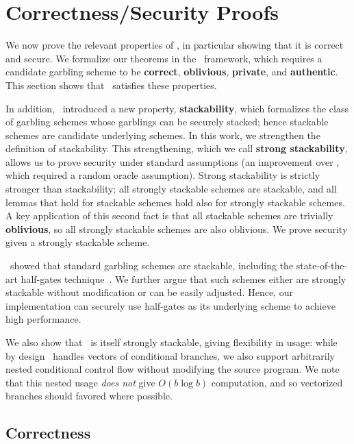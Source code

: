 \section{Correctness/Security Proofs}\label{sec:proof}

We now prove the relevant properties of \ourscheme, in particular
showing that it is correct and secure.
We formalize our theorems in the~\cite{CCS:BelHoaRog12} framework,
which requires a candidate garbling scheme to be \textbf{correct},
\textbf{oblivious}, \textbf{private}, and \textbf{authentic}.
This section shows that \ourscheme\ satisfies these properties.

In addition, \HK\ introduced a new property, \textbf{stackability}, which
formalizes the class of garbling schemes whose garblings can be
securely stacked; hence stackable schemes are candidate underlying
schemes.
%
In this work, we strengthen the definition of stackability.  This
strengthening, which we call \textbf{strong stackability}, allows us to
prove security under standard assumptions (an improvement over \HK,
which required a random oracle assumption).
Strong stackability is strictly stronger than stackability; all
strongly
stackable schemes are stackable,
and all lemmas that hold for stackable schemes hold also for strongly
stackable schemes.
A key application of this second fact is that all stackable schemes
are trivially \textbf{oblivious}, so all strongly stackable schemes are
also oblivious.
We prove security given a strongly stackable scheme.

\HK\ showed that standard garbling schemes are stackable, including
the state-of-the-art half-gates technique~\cite{EC:ZahRosEva15}.
We further argue that such schemes either are strongly stackable without
modification or can be easily adjusted.
Hence, our implementation can securely use half-gates as its underlying
scheme to achieve high performance.

We also show that \ourscheme\ is itself strongly stackable, giving
flexibility in usage: while by design \ourscheme\ handles vectors
of conditional branches, we also support arbitrarily nested
conditional control flow without modifying the source program.
%
We note that this nested usage \emph{does not} give $O(b\log b)$
computation, and so vectorized branches should favored where possible.



\subsection{Correctness}\label{sec:correctness}

